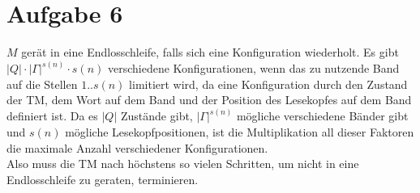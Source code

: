 \documentclass[a4paper,11pt]{scrartcl}
\begin{document}
	
	\section*{Aufgabe 6}
	$M$ gerät in eine Endlosschleife, falls sich eine Konfiguration wiederholt. Es gibt $\vert Q \vert \cdot {\vert \Gamma \vert }^{s(n)} \cdot s(n)$ verschiedene Konfigurationen, wenn das zu nutzende Band auf die Stellen $1..s(n)$ limitiert wird, da eine Konfiguration durch den Zustand der TM, dem Wort auf dem Band und der Position des Lesekopfes auf dem Band definiert ist. Da es $\vert Q \vert$ Zustände gibt, ${\vert \Gamma \vert}^{s(n)}$ mögliche verschiedene Bänder gibt und $s(n)$ mögliche Lesekopfpositionen, ist die Multiplikation all dieser Faktoren die maximale Anzahl verschiedener Konfigurationen.\\
	Also muss die TM nach höchstens so vielen Schritten, um nicht in eine Endlosschleife zu geraten, terminieren.
\end{document}
